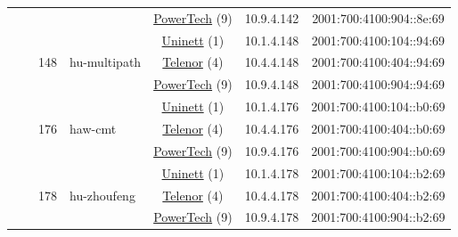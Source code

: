 \begin{small}
\begin{center}
\begin{longtable}{|c|c|c|c|c|c|c|c|}
  &  &  &  & \multicolumn{2}{|c|}{\tiny{\href{http://www.powertech.no}{PowerTech} (9)}} & \tiny{10.9.4.142} & \tiny{2001:700:4100:904::8e:69} \\* \cline{3-3}\cline{4-4}\cline{5-5}\cline{6-6}\cline{7-7}\cline{8-8}
  &  & \multirow{3}{*}{\tiny{148}} & \multicolumn{1}{|l|}{\multirow{3}{*}{\tiny{hu-multipath}}} & \multicolumn{2}{|c|}{\tiny{\href{https://www.uninett.no}{Uninett} (1)}} & \tiny{10.1.4.148} & \tiny{2001:700:4100:104::94:69} \\* \cline{5-5}\cline{6-6}\cline{7-7}\cline{8-8}
  &  &  &  & \multicolumn{2}{|c|}{\tiny{\href{https://www.telenor.no}{Telenor} (4)}} & \tiny{10.4.4.148} & \tiny{2001:700:4100:404::94:69} \\* \cline{5-5}\cline{6-6}\cline{7-7}\cline{8-8}
  &  &  &  & \multicolumn{2}{|c|}{\tiny{\href{http://www.powertech.no}{PowerTech} (9)}} & \tiny{10.9.4.148} & \tiny{2001:700:4100:904::94:69} \\* \cline{3-3}\cline{4-4}\cline{5-5}\cline{6-6}\cline{7-7}\cline{8-8}
  &  & \multirow{3}{*}{\tiny{176}} & \multicolumn{1}{|l|}{\multirow{3}{*}{\tiny{haw-cmt}}} & \multicolumn{2}{|c|}{\tiny{\href{https://www.uninett.no}{Uninett} (1)}} & \tiny{10.1.4.176} & \tiny{2001:700:4100:104::b0:69} \\* \cline{5-5}\cline{6-6}\cline{7-7}\cline{8-8}
  &  &  &  & \multicolumn{2}{|c|}{\tiny{\href{https://www.telenor.no}{Telenor} (4)}} & \tiny{10.4.4.176} & \tiny{2001:700:4100:404::b0:69} \\* \cline{5-5}\cline{6-6}\cline{7-7}\cline{8-8}
  &  &  &  & \multicolumn{2}{|c|}{\tiny{\href{http://www.powertech.no}{PowerTech} (9)}} & \tiny{10.9.4.176} & \tiny{2001:700:4100:904::b0:69} \\* \cline{3-3}\cline{4-4}\cline{5-5}\cline{6-6}\cline{7-7}\cline{8-8}
  &  & \multirow{3}{*}{\tiny{178}} & \multicolumn{1}{|l|}{\multirow{3}{*}{\tiny{hu-zhoufeng}}} & \multicolumn{2}{|c|}{\tiny{\href{https://www.uninett.no}{Uninett} (1)}} & \tiny{10.1.4.178} & \tiny{2001:700:4100:104::b2:69} \\* \cline{5-5}\cline{6-6}\cline{7-7}\cline{8-8}
  &  &  &  & \multicolumn{2}{|c|}{\tiny{\href{https://www.telenor.no}{Telenor} (4)}} & \tiny{10.4.4.178} & \tiny{2001:700:4100:404::b2:69} \\* \cline{5-5}\cline{6-6}\cline{7-7}\cline{8-8}
  &  &  &  & \multicolumn{2}{|c|}{\tiny{\href{http://www.powertech.no}{PowerTech} (9)}} & \tiny{10.9.4.178} & \tiny{2001:700:4100:904::b2:69} \\* \cline{3-3}\cline{4-4}\cline{5-5}\cline{6-6}\cline{7-7}\cline{8-8}

\end{longtable}
\end{center}
\end{small}
